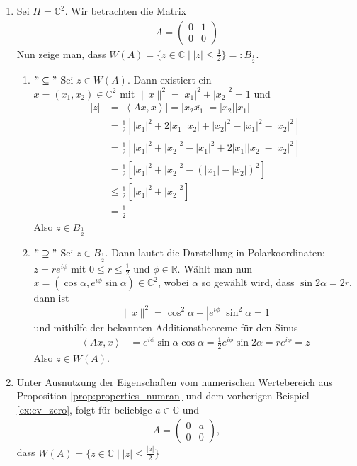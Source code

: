 \begin{ex} \label{ex:num_ran}
	\begin{enumerate}[label=(\roman*)]
		\item \label{ex:ev_zero} Sei $H=\mathbb{C}^2$. Wir betrachten die Matrix 
		\begin{align*}
			A = \begin{pmatrix}
				0 & 1 \\
				0 & 0
			\end{pmatrix}
		\end{align*}
		Nun zeige man, dass $W(A)= \{ z \in \mathbb{C} \;  | \; |z| \le \frac{1}{2} \} =: B_\frac{1}{2}$.
		\begin{enumerate}[label=]
			\item $"\subseteq"$ Sei $z\in W(A)$. Dann existiert ein $x=(x_1, x_2) \in \mathbb{C}^2 \text{ mit } \|x\|^2= |x_1|^2 + |x_2|^2=1$ und
			\begin{align}
				|z|&=|\left< Ax,x \right>| = |x_2\overline{x_1}|= |x_2||x_1| \nonumber \\
				& = \frac{1}{2} \left[|x_1|^2 + 2|x_1||x_2| +|x_2|^2 - |x_1|^2 - |x_2|^2 \right] \nonumber \\
				& = \frac{1}{2} \left[|x_1|^2 +|x_2|^2 - |x_1|^2 + 2|x_1||x_2| -|x_2|^2 \right] \nonumber \\
				& =  \frac{1}{2} \left[|x_1|^2 +|x_2|^2 - (|x_1| -|x_2|)^2 \right] \nonumber \\
				& \le \frac{1}{2} \left[|x_1|^2 +|x_2|^2 \right] \nonumber \\
				& = \frac{1}{2}
			\end{align} 
			Also $z \in B_\frac{1}{2}$
			\item $"\supseteq"$ Sei $z \in B_\frac{1}{2}$. Dann lautet die Darstellung in Polarkoordinaten: $z=re^{i\phi}$ mit $0 \le r \le \frac{1}{2}$ und $\phi \in \mathbb{R}$. Wählt man nun $x=(\cos \alpha, e^{i\phi}\sin \alpha) \in \mathbb{C}^2$, wobei $\alpha$ so gewählt wird, dass $\sin 2\alpha = 2r$, dann ist \[ \| x\|^2=\cos^2 \alpha + |e^{i\phi}|\sin^2 \alpha=1 \] und mithilfe der bekannten Additionstheoreme für den Sinus
			\begin{align}
				\left< Ax,x \right> &= e^{i\phi}\sin \alpha \cos \alpha = \frac{1}{2} e^{i\phi} \sin 2\alpha = re^{i\phi} = z
			\end{align}
			Also $z \in W(A)$.
		\end{enumerate}

		\item Unter Ausnutzung der Eigenschaften vom numerischen Wertebereich aus Proposition \ref{prop:properties_numran} und dem vorherigen Beispiel \ref{ex:ev_zero}, folgt für beliebige $a \in \mathbb{C}$ und 
		\begin{align*}
			A = \begin{pmatrix}
				0 & a \\
				0 & 0
			\end{pmatrix},
		\end{align*}
		dass $W(A)= \{ z \in \mathbb{C} \;  | \; |z| \le \frac{|a|}{2} \}$


\end{enumerate}
\end{ex}
